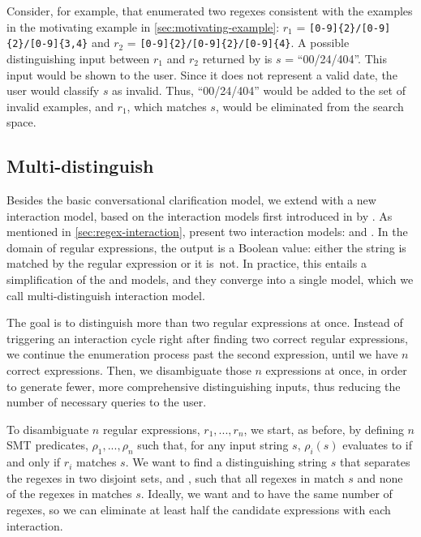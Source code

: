 \begin{example}
Consider, for example, that \Forest{} enumerated two regexes consistent with the examples in the motivating example in \autoref{sec:motivating-example}:
\(r_1\) = \Verb![0-9]{2}/[0-9]{2}/[0-9]{3,4}!
and
\(r_2\) = 
\Verb![0-9]{2}/[0-9]{2}/[0-9]{4}!. 
A possible distinguishing input between \(r_1\) and \(r_2\) returned by \Forest{} is \(s\) = ``00/24/404''. This input would be shown to the user. Since it does not represent a valid date, the user would classify \(s\) as invalid. Thus, ``00/24/404'' would be added to the set of invalid examples, and \(r_1\), which matches \(s\), would be eliminated from the search space.
\end{example}



\subsection{Multi-distinguish}\label{sec:multi-dist}

Besides the basic conversational clarification model, we extend \Forest{} with a new interaction model, based on the interaction models first introduced in \citeyear{UnchartIt20} by \citet{UnchartIt20}. 
As mentioned in \autoref{sec:regex-interaction}, \citeauthor{UnchartIt20} present two interaction models: \ynmodel and \optmodel.
In the domain of regular expressions, the output is a Boolean value: either the string is matched by the regular expression or it is~not. In practice, this entails a simplification of the \ynmodel and \optmodel models, and they converge into a single model, which we call multi-distinguish interaction model.

The goal is to distinguish more than two regular expressions at once. Instead of triggering an interaction cycle right after finding two correct regular expressions, we continue the enumeration process past the second expression, until we have \(n\) correct expressions. Then, we disambiguate those \(n\) expressions at once, in order to generate fewer, more comprehensive distinguishing inputs, thus reducing the number of necessary queries to the user.

To disambiguate \(n\) regular expressions, \(r_1, ..., r_n\), we start, as before, by defining \(n\) \ac{SMT} predicates, \(\rho_1, ..., \rho_n\) such that, for any input string \(s\), \(\rho_i(s)\) evaluates to \true{} if and only if \(r_i\) matches \(s\).
We want to find a distinguishing string \(s\) that separates the regexes in two disjoint sets,  and , such that all regexes in  match \(s\) and none of the regexes in  matches \(s\). Ideally, we want  and  to have the same number of regexes, so we can eliminate at least half the candidate expressions with each interaction.


